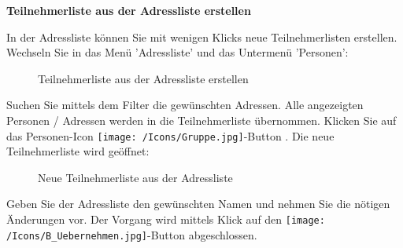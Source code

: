 \vspace{\baselineskip}

\textbf{Teilnehmerliste aus der Adressliste erstellen}
\label{bkm:Ref20190313001}

\vspace{\baselineskip}

In der Adressliste können Sie mit wenigen Klicks neue Teilnehmerlisten erstellen. Wechseln Sie in das Menü 'Adressliste' und das Untermenü 'Personen':

\begin{figure}[H]
\caption{Teilnehmerliste aus der Adressliste erstellen}
\end{figure}

Suchen Sie mittels dem Filter  die gewünschten Adressen. Alle angezeigten Personen / Adressen  werden in die Teilnehmerliste übernommen. Klicken Sie auf das Personen-Icon \texttt{[image: /Icons/Gruppe.jpg]}-Button .
Die neue Teilnehmerliste wird geöffnet:

\begin{figure}[H]
\caption{Neue Teilnehmerliste aus der Adressliste}
\end{figure}

Geben Sie der Adressliste den gewünschten Namen und nehmen Sie die nötigen Änderungen vor. Der Vorgang wird mittels Klick auf den \texttt{[image: /Icons/B\_Uebernehmen.jpg]}-Button  abgeschlossen.

\vspace{\baselineskip}

